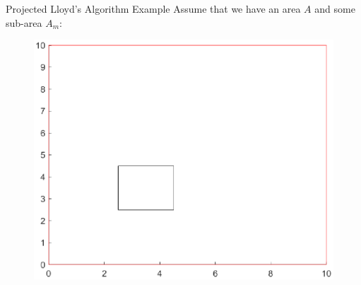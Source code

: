 \documentclass[t]{beamer}
\begin{document}
\begin{frame}[label=projlloydsalgoexample]{Projected Lloyd's Algorithm Example}
Assume that we have an area $A$ and some sub-area $A_m$:
\begin{figure}
\includegraphics[scale=0.6]{Problem-solution/PLA-example-empty.eps}
\end{figure}
\end{frame}
\end{document}
